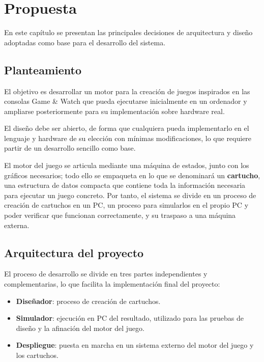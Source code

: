\documentclass[../main.tex]{subfiles}
\begin{document}
	\chapter{Propuesta}
	\label{C:propuesta}

	En este capítulo se presentan las principales decisiones de arquitectura y diseño adoptadas como base para el desarrollo del sistema.

	\section{Planteamiento}
	\label{sec:planteamiento}

	El objetivo es desarrollar un motor para la creación de juegos inspirados en las consolas Game \& Watch que pueda ejecutarse inicialmente en un ordenador y ampliarse posteriormente para su implementación sobre hardware real.

	El diseño debe ser abierto, de forma que cualquiera pueda implementarlo en el lenguaje y hardware de su elección con mínimas modificaciones, lo que requiere partir de un desarrollo sencillo como base.

	El motor del juego se articula mediante una máquina de estados, junto con los gráficos necesarios; todo ello se empaqueta en lo que se denominará un \textbf{cartucho}, una estructura de datos compacta que contiene toda la información necesaria para ejecutar un juego concreto. Por tanto, el sistema se divide en un proceso de creación de cartuchos en un PC, un proceso para simularlos en el propio PC y poder verificar que funcionan correctamente, y su traspaso a una máquina externa.

	\section{Arquitectura del proyecto}
	\label{sec:arquitectura}

	El proceso de desarrollo se divide en tres partes independientes y complementarias, lo que facilita la implementación final del proyecto:

	\begin{itemize}
		\item \textbf{Diseñador}: proceso de creación de cartuchos.
		\item \textbf{Simulador}: ejecución en PC del resultado, utilizado para las pruebas de diseño y la afinación del motor del juego.
		\item \textbf{Despliegue}: puesta en marcha en un sistema externo del motor del juego y los cartuchos.
	\end{itemize}
\end{document}
